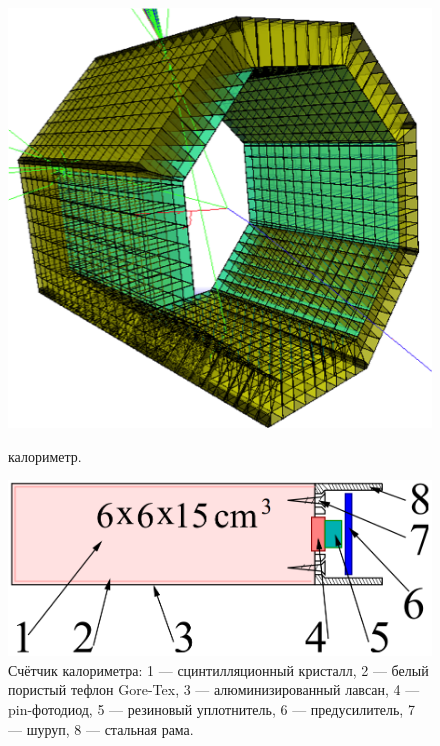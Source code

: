 \begin{figure}[htbp]
    \begin{minipage}[t]{0.35\textwidth}
        \centering
        \includegraphics[width=\textwidth]{img/cmd3_detector/csi_scketch.png}
        \caption{ калориметр.}\label{fig:lxe_sketch}
    \end{minipage}
    \qquad
    \begin{minipage}[t]{0.60\textwidth}
        \centering
        \includegraphics[width=.9\textwidth]{img/cmd3_detector/csi_crystal_scheme_v2.png}
        \caption{Счётчик  калориметра:
        1 --- сцинтилляционный кристалл,
        2 --- белый пористый тефлон Gore-Tex,
        3 --- алюминизированный лавсан,
        4 --- pin-фотодиод,
        5 --- резиновый уплотнитель,
        6 --- предусилитель,
        7 --- шуруп,
        8 --- стальная рама.}\label{lxe_electrode_structure}
  \end{minipage}
\end{figure}


